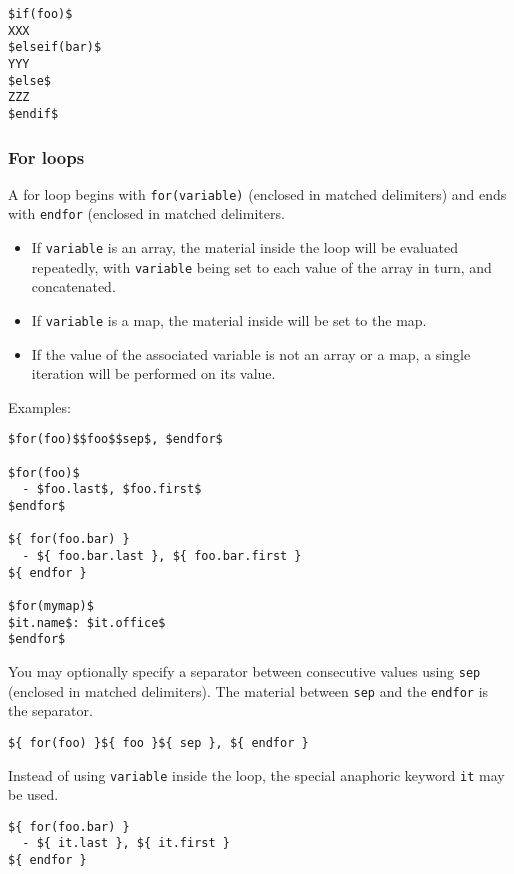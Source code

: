\documentclass[]{article}
\providecommand{\tightlist}{%
  \setlength{\itemsep}{0pt}\setlength{\parskip}{0pt}}
\begin{document}
\begin{verbatim}
$if(foo)$
XXX
$elseif(bar)$
YYY
$else$
ZZZ
$endif$
\end{verbatim}

\hypertarget{for-loops}{%
\subsubsection{For loops}\label{for-loops}}

A for loop begins with \texttt{for(variable)} (enclosed in matched
delimiters) and ends with \texttt{endfor} (enclosed in matched
delimiters.

\begin{itemize}
\tightlist
\item
  If \texttt{variable} is an array, the material inside the loop will be
  evaluated repeatedly, with \texttt{variable} being set to each value
  of the array in turn, and concatenated.
\item
  If \texttt{variable} is a map, the material inside will be set to the
  map.
\item
  If the value of the associated variable is not an array or a map, a
  single iteration will be performed on its value.
\end{itemize}

Examples:

\begin{verbatim}
$for(foo)$$foo$$sep$, $endfor$

$for(foo)$
  - $foo.last$, $foo.first$
$endfor$

${ for(foo.bar) }
  - ${ foo.bar.last }, ${ foo.bar.first }
${ endfor }

$for(mymap)$
$it.name$: $it.office$
$endfor$
\end{verbatim}

You may optionally specify a separator between consecutive values using
\texttt{sep} (enclosed in matched delimiters). The material between
\texttt{sep} and the \texttt{endfor} is the separator.

\begin{verbatim}
${ for(foo) }${ foo }${ sep }, ${ endfor }
\end{verbatim}

Instead of using \texttt{variable} inside the loop, the special
anaphoric keyword \texttt{it} may be used.

\begin{verbatim}
${ for(foo.bar) }
  - ${ it.last }, ${ it.first }
${ endfor }
\end{verbatim}
\end{document}
